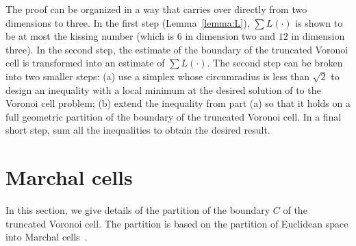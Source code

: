 \documentclass{llncs}
\begin{document}
\begin{remark}
  The proof can be organized in a way that carries over directly from
  two dimensions to three.  In the first step (Lemma~\ref{lemma:L}),
  $\sum L(\cdot)$ is shown to be at most the kissing number (which is $6$ in dimension two and
$12$ in dimension three).  In the
  second step, the estimate of the boundary of the truncated Voronoi
  cell is transformed into an estimate of $\sum L(\cdot)$.  The second
  step can be broken into two smaller steps: (a) use a simplex whose
  circumradius is less than $\sqrt2$ to design an inequality with a
  local minimum at the desired solution of to the Voronoi cell
  problem; (b) extend the inequality from part (a) so that it holds on
  a full geometric partition of the boundary of the truncated Voronoi
  cell.  In a final short step, sum all the inequalities to obtain the
  desired result.
\end{remark}


\section{Marchal cells}

In this section, we give details of the partition of the boundary $C$
of the truncated Voronoi cell.  The partition is based on the
partition of Euclidean space into Marchal cells~\cite{marchal:2009}.
\end{document}
